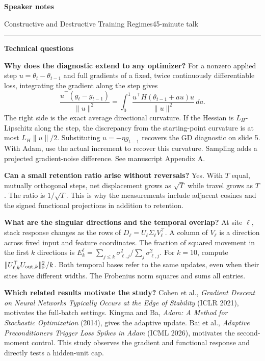 \documentclass[11pt]{article}
\begin{document}
{\huge\bfseries Speaker notes}\par
Constructive and Destructive Training Regimes\hfill 45-minute talk\par
\smallskip\hrule\medskip

\clearpage
{\LARGE\bfseries Technical questions}\par
\textbf{Why does the diagnostic extend to any optimizer?}
For a nonzero applied step \(u=\theta_t-\theta_{t-1}\) and full gradients of a fixed, twice continuously differentiable loss, integrating the gradient along the step gives
\[
\frac{u^\top(g_t-g_{t-1})}{\|u\|^2}
=\int_0^1\frac{u^\top H(\theta_{t-1}+au)u}{\|u\|^2}\,da.
\]
The right side is the exact average directional curvature. If the Hessian is \(L_H\)-Lipschitz along the step, the discrepancy from the starting-point curvature is at most \(L_H\|u\|/2\). Substituting \(u=-\eta g_{t-1}\) recovers the GD diagnostic on slide 5. With Adam, use the actual increment to recover this curvature. Sampling adds a projected gradient-noise difference. See manuscript Appendix A.

\textbf{Can a small retention ratio arise without reversals?}
Yes. With \(T\) equal, mutually orthogonal steps, net displacement grows as \(\sqrt{T}\) while travel grows as \(T\). The ratio is \(1/\sqrt{T}\). This is why the measurements include adjacent cosines and the signed functional projections in addition to retention.

\textbf{What are the singular directions and the temporal overlap?}
At site \(\ell\), stack response changes as the rows of \(D_\ell=U_\ell\Sigma_\ell V_\ell^\top\).
A column of \(V_\ell\) is a direction across fixed input and feature coordinates. The fraction of squared movement in the first \(k\) directions is
\(E_k^\ell=\sum_{j\le k}\sigma_{\ell,j}^2/\sum_j\sigma_{\ell,j}^2\).
For \(k=10\), compute \(\|U_{\ell,k}^\top U_{\mathrm{out},k}\|_{\rm F}^2/k\).
Both temporal bases refer to the same updates, even when their sites have different widths. The Frobenius norm squares and sums all entries.

\textbf{Which related results motivate the study?}
Cohen et al., \emph{Gradient Descent on Neural Networks Typically Occurs at the Edge of Stability} (ICLR 2021), motivates the full-batch settings. Kingma and Ba, \emph{Adam: A Method for Stochastic Optimization} (2014), gives the adaptive update. Bai et al., \emph{Adaptive Preconditioners Trigger Loss Spikes in Adam} (ICML 2026), motivates the second-moment control. This study observes the gradient and functional response and directly tests a hidden-unit cap.
\end{document}
